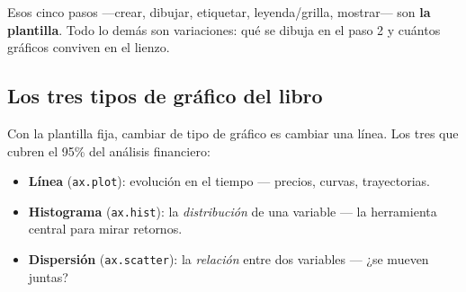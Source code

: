 \documentclass[
  spanish,
  letterpaper,
  DIV=11,
  numbers=noendperiod]{scrreprt}
\providecommand{\tightlist}{%
  \setlength{\itemsep}{0pt}\setlength{\parskip}{0pt}}
\begin{document}
Esos cinco pasos ---crear, dibujar, etiquetar, leyenda/grilla,
mostrar--- son \textbf{la plantilla}. Todo lo demás son variaciones: qué
se dibuja en el paso 2 y cuántos gráficos conviven en el lienzo.

\subsection{Los tres tipos de gráfico del
libro}\label{los-tres-tipos-de-gruxe1fico-del-libro}

Con la plantilla fija, cambiar de tipo de gráfico es cambiar una línea.
Los tres que cubren el 95\% del análisis financiero:

\begin{itemize}
\tightlist
\item
  \textbf{Línea} (\texttt{ax.plot}): evolución en el tiempo --- precios,
  curvas, trayectorias.
\item
  \textbf{Histograma} (\texttt{ax.hist}): la \emph{distribución} de una
  variable --- la herramienta central para mirar retornos.
\item
  \textbf{Dispersión} (\texttt{ax.scatter}): la \emph{relación} entre
  dos variables --- ¿se mueven juntas?
\end{itemize}
\end{document}

